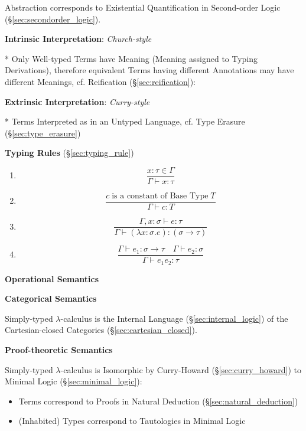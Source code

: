 Abstraction corresponds to Existential Quantification in Second-order
Logic (\S\ref{sec:secondorder_logic}).



\textbf{Intrinsic Interpretation}: \emph{Church-style}

* Only Well-typed Terms have Meaning (Meaning assigned to Typing
Derivations), therefore equivalent Terms having different Annotations
may have different Meanings, cf. Reification
(\S\ref{sec:reification}):



\textbf{Extrinsic Interpretation}: \emph{Curry-style}

* Terms Interpreted as in an Untyped Language, cf. Type Erasure
(\S\ref{sec:type_erasure})



\textbf{Typing Rules} (\S\ref{sec:typing_rule})

\begin{enumerate}
\item
  \[
    {
      \frac
      {x : \tau \in \Gamma}
      {\Gamma \vdash x : \tau}
    }
  \]
\item
  \[
    {
      \frac
      {c \;\text{is a constant of Base Type}\; T}
      {\Gamma \vdash c:T}
    }
  \]
\item
  \[
    {
      \frac
      {\Gamma, x:\sigma \vdash e:\tau}
      {\Gamma \vdash (\lambda x:\sigma.e):(\sigma \rightarrow \tau)}
    }
  \]
\item
  \[
    {
      \frac
      {\Gamma \vdash e_1:\sigma \rightarrow \tau \quad
        \Gamma \vdash e_2:\sigma}
      {\Gamma \vdash e_1 e_2 : \tau}
    }
  \]
\end{enumerate}



\textbf{Operational Semantics}

\textbf{Categorical Semantics}

Simply-typed $\lambda$-calculus is the Internal Language
(\S\ref{sec:internal_logic}) of the Cartesian-closed Categories
(\S\ref{sec:cartesian_closed}).



\textbf{Proof-theoretic Semantics}

Simply-typed $\lambda$-calculus is Isomorphic by Curry-Howard
(\S\ref{sec:curry_howard}) to Minimal Logic
(\S\ref{sec:minimal_logic}):
\begin{itemize}
  \item Terms correspond to Proofs in Natural Deduction
    (\S\ref{sec:natural_deduction})
  \item (Inhabited) Types correspond to Tautologies in Minimal Logic
\end{itemize}

